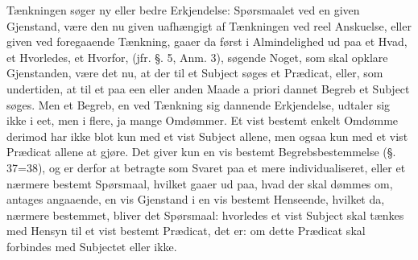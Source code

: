 \documentclass[12pt]{book}
\def\textit#1{#1}%
\def\emph#1{#1}%
\newcommand{\opage}[1]{\marginnote{\footnotesize\textit{[#1]}}}
\begin{document}
Tænkningen søger ny eller bedre Erkjendelse: Spørsmaalet ved en given Gjenstand, være den
nu given uafhængigt af Tænkningen ved reel
\opage{266} Anskuelse, eller given ved foregaaende Tænkning, gaaer da først i Almindelighed ud paa et
Hvad, et Hvorledes, et Hvorfor, (jfr. §. 5, Anm. 3), søgende Noget, som skal opklare
Gjenstanden, være det nu, at der til et Subject søges et Prædicat, eller, som undertiden,
at til et paa een eller anden Maade \textit{a priori} dannet Begreb et Subject søges. Men
et Begreb, en ved Tænkning sig dannende Erkjendelse, udtaler sig ikke i eet, men i flere,
ja mange Omdømmer. Et vist bestemt enkelt \emph{Omdømme} derimod har ikke blot kun med et
vist Subject allene, men ogsaa kun med et vist Prædicat allene at gjøre. Det giver kun en
vis bestemt Begrebsbestemmelse (§. 37=38), og er derfor at betragte som Svaret paa et mere
individualiseret, eller et nærmere bestemt Spørsmaal, hvilket gaaer ud paa, hvad der skal
dømmes om, antages angaaende, en vis Gjenstand i en vis bestemt Henseende, hvilket da,
nærmere bestemmet, bliver det Spørsmaal: hvorledes et vist Subject skal tænkes med Hensyn
til et vist bestemt Prædicat, det er: om dette Prædicat skal forbindes med Subjectet eller
ikke.
\end{document}
